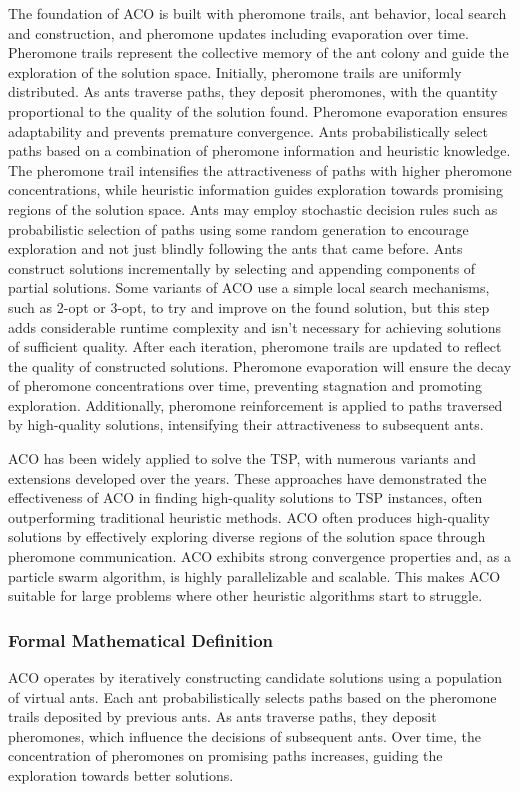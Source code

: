 \documentclass[11pt]{report}
\begin{document}
            The foundation of ACO is built with pheromone trails, ant behavior, local search and construction, and pheromone updates including evaporation over time. Pheromone trails represent the collective memory of the ant colony and guide the exploration of the solution space. Initially, pheromone trails are uniformly distributed. As ants traverse paths, they deposit pheromones, with the quantity proportional to the quality of the solution found. Pheromone evaporation ensures adaptability and prevents premature convergence. Ants probabilistically select paths based on a combination of pheromone information and heuristic knowledge. The pheromone trail intensifies the attractiveness of paths with higher pheromone concentrations, while heuristic information guides exploration towards promising regions of the solution space. Ants may employ stochastic decision rules such as probabilistic selection of paths using some random generation to encourage exploration and not just blindly following the ants that came before. Ants construct solutions incrementally by selecting and appending components of partial solutions. Some variants of ACO use a simple local search mechanisms, such as 2-opt or 3-opt, to try and improve on the found solution, but this step adds considerable runtime complexity and isn't necessary for achieving solutions of sufficient quality. After each iteration, pheromone trails are updated to reflect the quality of constructed solutions. Pheromone evaporation will ensure the decay of pheromone concentrations over time, preventing stagnation and promoting exploration. Additionally, pheromone reinforcement is applied to paths traversed by high-quality solutions, intensifying their attractiveness to subsequent ants.
            
            ACO has been widely applied to solve the TSP, with numerous variants and extensions developed over the years. These approaches have demonstrated the effectiveness of ACO in finding high-quality solutions to TSP instances, often outperforming traditional heuristic methods. ACO often produces high-quality solutions by effectively exploring diverse regions of the solution space through pheromone communication. ACO exhibits strong convergence properties and, as a particle swarm algorithm, is highly parallelizable and scalable. This makes ACO suitable for large problems where other heuristic algorithms start to struggle.

            \subsubsection{Formal Mathematical Definition}
            ACO operates by iteratively constructing candidate solutions using a population of virtual ants. Each ant probabilistically selects paths based on the pheromone trails deposited by previous ants. As ants traverse paths, they deposit pheromones, which influence the decisions of subsequent ants. Over time, the concentration of pheromones on promising paths increases, guiding the exploration towards better solutions.
            
\end{document}
